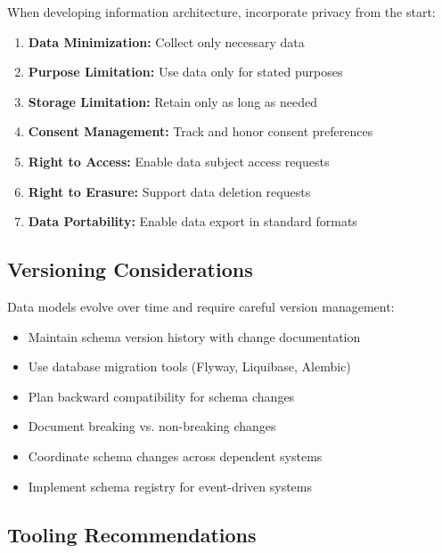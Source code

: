 \documentclass[11pt,letterpaper]{article}
\begin{document}
\begin{privacybox}
When developing information architecture, incorporate privacy from the start:

\begin{enumerate}[nosep]
    \item \textbf{Data Minimization:} Collect only necessary data
    \item \textbf{Purpose Limitation:} Use data only for stated purposes
    \item \textbf{Storage Limitation:} Retain only as long as needed
    \item \textbf{Consent Management:} Track and honor consent preferences
    \item \textbf{Right to Access:} Enable data subject access requests
    \item \textbf{Right to Erasure:} Support data deletion requests
    \item \textbf{Data Portability:} Enable data export in standard formats
\end{enumerate}
\end{privacybox}

\subsection{Versioning Considerations}

Data models evolve over time and require careful version management:

\begin{itemize}
    \item Maintain schema version history with change documentation
    \item Use database migration tools (Flyway, Liquibase, Alembic)
    \item Plan backward compatibility for schema changes
    \item Document breaking vs. non-breaking changes
    \item Coordinate schema changes across dependent systems
    \item Implement schema registry for event-driven systems
\end{itemize}

\subsection{Tooling Recommendations}
\end{document}
